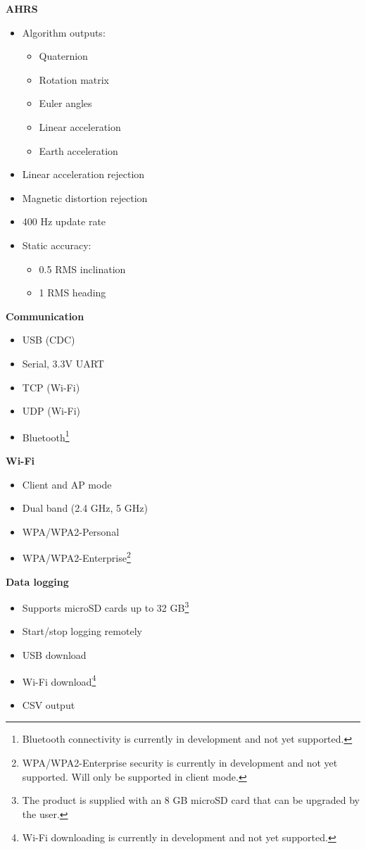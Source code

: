 \begin{multicols}{2}
\textbf{\acs{AHRS}}
\begin{itemize}[nolistsep]
    \item Algorithm outputs:
    \begin{itemize}
        \item Quaternion
        \item Rotation matrix
        \item Euler angles
        \item Linear acceleration
        \item Earth acceleration
    \end{itemize}
    \item Linear acceleration rejection
    \item Magnetic distortion rejection
    \item 400 Hz update rate
    \item Static accuracy:
        \begin{itemize}
            \item 0.5\textdegree{} \acs{RMS} inclination
            \item 1\textdegree{} \acs{RMS} heading
        \end{itemize}
\end{itemize}

\columnbreak

\textbf{Communication}
\begin{itemize}[nolistsep]
    \item \acs{USB} (\acs{CDC})
    \item Serial, 3.3V \acs{UART}
    \item \acs{TCP} (Wi-Fi)
    \item \acs{UDP} (Wi-Fi)
    \item Bluetooth\footnote{Bluetooth connectivity is currently in development and not yet supported.}
\end{itemize}

\textbf{Wi-Fi}
\begin{itemize}[nolistsep]
    \item Client and \acs{AP} mode
    \item Dual band (2.4 GHz, 5 GHz)
    \item WPA/WPA2-Personal
    \item WPA/WPA2-Enterprise\footnote{WPA/WPA2-Enterprise security is currently in development and not yet supported. Will only be supported in client mode.}
\end{itemize}

\textbf{Data logging}
\begin{itemize}[nolistsep]
    \item Supports \acs{microSD} cards up to 32 GB\footnote{The product is supplied with an 8 GB \acs{microSD} card that can be upgraded by the user.}
    \item Start/stop logging remotely
    \item USB download
    \item Wi-Fi download\footnote{Wi-Fi downloading is currently in development and not yet supported.}
    \item \acs{CSV} output
\end{itemize}


\end{multicols}

